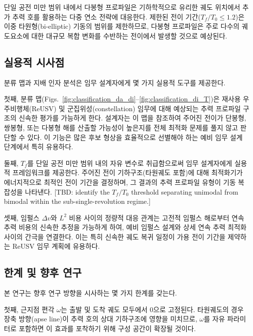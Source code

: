 \documentclass[a4paper,fleqn]{cas-dc}
\let\origsubsection\subsection
\renewcommand{\subsection}{\FloatBarrier\origsubsection}
\begin{document}
단일 공전 미만 범위 내에서 다봉형 프로파일은 기하학적으로 유리한 궤도 위치에서 추가 추력 호를 활용하는 다중 연소 전략에 대응한다. 제한된 전이 기간($T_f/T_0 \leq 1.2$)은 이중 타원형(bi-elliptic) 기동의 범위를 제한하므로, 다봉형 프로파일은 주로 다수의 궤도요소에 대한 대규모 복합 변화를 수반하는 전이에서 발생할 것으로 예상된다.

\subsection{실용적 시사점}\label{subsec:practical_implications}

분류 맵과 지배 인자 분석은 임무 설계자에게 몇 가지 실용적 도구를 제공한다.

첫째, 분류 맵(Figs.~\ref{fig:classification_da_di}--\ref{fig:classification_di_T})은 재사용 우주비행체(ReUSV) 및 군집위성(constellation) 임무에 대해 예상되는 추력 프로파일 구조의 신속한 평가를 가능하게 한다. 설계자는 이 맵을 참조하여 주어진 전이가 단봉형, 쌍봉형, 또는 다봉형 해를 산출할 가능성이 높은지를 전체 최적화 문제를 풀지 않고 판단할 수 있다. 이 기능은 많은 후보 형상을 효율적으로 선별해야 하는 예비 임무 설계 단계에서 특히 유용하다.

둘째, $T_f$를 단일 공전 미만 범위 내의 자유 변수로 취급함으로써 임무 설계자에게 실용적 프레임워크를 제공한다. 주어진 전이 기하구조(타원궤도 포함)에 대해 최적화기가 에너지적으로 최적인 전이 기간을 결정하며, 그 결과의 추력 프로파일 유형이 기동 복잡성을 나타낸다. [TBD: identify the $T_f/T_0$ threshold separating unimodal from bimodal within the sub-single-revolution regime.]

셋째, 임펄스 $\Delta v$와 $L^2$ 비용 사이의 정량적 대응 관계는 고전적 임펄스 해로부터 연속 추력 비용의 신속한 추정을 가능하게 하여, 예비 임펄스 설계와 상세 연속 추력 최적화 사이의 간극을 연결한다. 이는 특히 신속한 궤도 복귀 일정이 가용 전이 기간을 제약하는 ReUSV 임무 계획에 유용하다.

\subsection{한계 및 향후 연구}\label{subsec:limitations}

본 연구는 향후 연구 방향을 시사하는 몇 가지 한계를 갖는다.

첫째, 근지점 편각 $\omega$는 출발 및 도착 궤도 모두에서 0으로 고정된다. 타원궤도의 경우 장축 방향(apse line)이 추력 호의 상대 기하구조에 영향을 미치므로, $\omega$를 자유 파라미터로 포함하면 이 효과를 포착하기 위해 구성 공간이 확장될 것이다.
\end{document}
